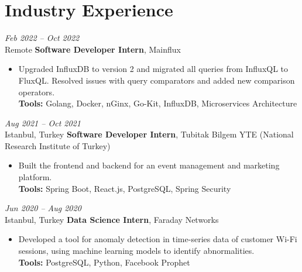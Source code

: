 \section{Industry Experience}

\begin{twocolentry}{
    \textit{Feb 2022 – Oct 2022}\\
    \small Remote}
    \normalsize \textbf{Software Developer Intern}, \small {Mainflux}
    \small  
    \begin{itemize}
        \item Upgraded InfluxDB to version 2 and migrated all queries from InfluxQL to FluxQL. Resolved issues with query comparators and added new comparison operators.\\
        \footnotesize \textbf{Tools:} Golang, Docker, nGinx, Go-Kit, InfluxDB, Microservices Architecture
    \end{itemize}
\end{twocolentry}

\vspace{\betweenentryspace}

\begin{twocolentry}{
    \textit{Aug 2021 – Oct 2021}\\
    \small Istanbul, Turkey}
    \normalsize \textbf{Software Developer Intern}, \small {Tubitak Bilgem YTE (National Research Institute of Turkey)}
    \small  
    \begin{itemize}
        \item Built the frontend and backend for an event management and marketing platform.\\
        \footnotesize \textbf{Tools:} Spring Boot, React.js, PostgreSQL, Spring Security
    \end{itemize}
    
\end{twocolentry}

\vspace{\betweenentryspace}

\newpage
\begin{twocolentry}{
    \textit{Jun 2020 – Aug 2020}\\
    \small Istanbul, Turkey}
    \normalsize \textbf{Data Science Intern}, \small {Faraday Networks}
    \small  
    \begin{itemize}
        \item Developed a tool for anomaly detection in time-series data of customer Wi-Fi sessions, using machine learning models to identify abnormalities.\\
        \footnotesize \textbf{Tools:} PostgreSQL, Python, Facebook Prophet
    \end{itemize}
    
\end{twocolentry}
